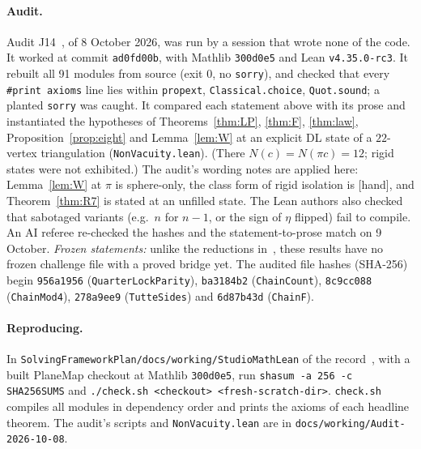 \documentclass[11pt]{article}
\theoremstyle{definition}
\newcommand{\lab}[1]{\textsf{[#1]}}
\newcommand{\lean}[1]{\texttt{#1}}
\begin{document}
\paragraph{Audit.} Audit J14~\cite{audit}, of 8 October 2026, was run by a session that wrote none of the code. It worked at commit \texttt{ad0fd00b}, with Mathlib \texttt{300d0e5} and Lean \texttt{v4.35.0-rc3}. It rebuilt all 91 modules from source (exit 0, no \texttt{sorry}), and checked that every \texttt{\#print axioms} line lies within \texttt{propext}, \texttt{Classical.choice}, \texttt{Quot.sound}; a planted \texttt{sorry} was caught. It compared each statement above with its prose and instantiated the hypotheses of Theorems~\ref{thm:LP}, \ref{thm:F}, \ref{thm:law}, Proposition~\ref{prop:eight} and Lemma~\ref{lem:W} at an explicit DL state of a $22$-vertex triangulation (\texttt{NonVacuity.lean}). (There $N(c)=N(\pi c)=12$; rigid states were not exhibited.) The audit's wording notes are applied here: Lemma~\ref{lem:W} at $\pi$ is sphere-only, the class form of rigid isolation is \lab{hand}, and Theorem~\ref{thm:R7} is stated at an unfilled state. The Lean authors also checked that sabotaged variants (e.g.\ $n$ for $n-1$, or the sign of $\eta$ flipped) fail to compile. An AI referee re-checked the hashes and the statement-to-prose match on 9 October. \emph{Frozen statements:} unlike the reductions in~\cite{vhe2026}, these results have no frozen challenge file with a proved bridge yet. The audited file hashes (SHA-256) begin \texttt{956a1956} (\lean{QuarterLockParity}), \texttt{ba3184b2} (\lean{ChainCount}), \texttt{8c9cc088} (\lean{ChainMod4}), \texttt{278a9ee9} (\lean{TutteSides}) and \texttt{6d87b43d} (\lean{ChainF}).

\paragraph{Reproducing.} In \texttt{SolvingFrameworkPlan/docs/working/StudioMathLean} of the record~\cite{record}, with a built PlaneMap checkout at Mathlib \texttt{300d0e5}, run \texttt{shasum -a 256 -c SHA256SUMS} and \texttt{./check.sh <checkout> <fresh-scratch-dir>}. \texttt{check.sh} compiles all modules in dependency order and prints the axioms of each headline theorem. The audit's scripts and \texttt{NonVacuity.lean} are in \texttt{docs/working/Audit-2026-10-08}.

\end{document}
